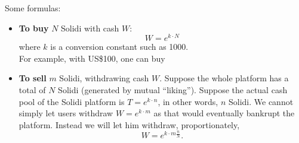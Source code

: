 \begin{preview}
\begin{minipage}{\textwidth}
\setlength{\parskip}{0.4\baselineskip}

Some formulas:
\begin{itemize}
	\item \textbf{To buy} $N$ Solidi with cash $W$:\\
		\begin{equation}
		W = e^{k \cdot N}
		\end{equation}
	where $k$ is a conversion constant such as 1000. \\
	For example, with US\$100, one can buy

	\item \textbf{To sell} $m$ Solidi, withdrawing cash $W$.  Suppose the whole platform has a total of $N$ Solidi (generated by mutual ``liking'').  Suppose the actual cash pool of the Solidi platform is $T = e^{k \cdot n}$, in other words, $n$ Solidi.  We cannot simply let users withdraw $W = e^{k \cdot m}$ as that would eventually bankrupt the platform.  Instead we will let him withdraw, proportionately,
	\begin{equation}
		W = e^{k \cdot m \frac{n}{N}} .
	\end{equation}

\end{itemize}

\end{minipage}
\end{preview}


